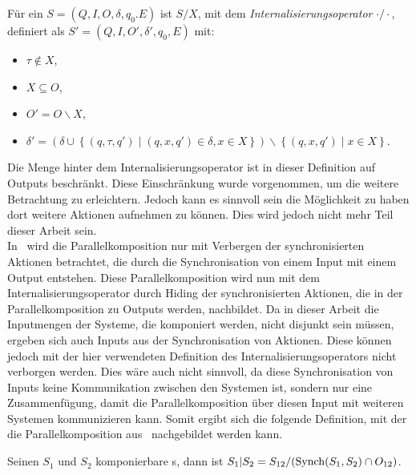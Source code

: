 \begin{Def}[Internalisierungsoperator]
  Für ein \EIO{} $S=(Q,I,O,\delta ,q_0.E)$ ist $S/X$, mit
  dem \emph{Internalisierungsoperator} $\cdot /\cdot$,
  definiert als $S'=(Q,I,O',\delta ', q_0,E)$ mit:
  \begin{itemize}
    \item $\tau \notin X$,
    \item $X\subseteq O$,
    \item $O'=O\backslash X$,
    \item $\delta '=\left(\delta\cup\left\{(q,\tau ,q')\mid (q,x,q')\in\delta
      ,x\in X\right\}\right)\backslash \left\{(q,x,q')\mid x\in X\right\}$.
  \end{itemize}
\end{Def}

Die Menge hinter dem Internalisierungsoperator ist in dieser Definition auf
Outputs beschränkt. Diese Einschränkung wurde vorgenommen, um die weitere
Betrachtung zu erleichtern. Jedoch kann es sinnvoll sein die Möglichkeit zu
haben dort weitere Aktionen aufnehmen zu können. Dies wird jedoch nicht mehr
Teil dieser Arbeit sein.\\
In~\cite{Vogler2014EIO} wird die Parallelkomposition nur mit Verbergen der
synchronisierten Aktionen betrachtet, die durch die Synchronisation von einem
Input mit einem Output entstehen. Diese Parallelkomposition wird nun mit dem
Internalisierungsoperator durch Hiding der synchronisierten Aktionen, die in
der Parallelkomposition zu Outputs werden, nachbildet. Da in dieser Arbeit
die Inputmengen der Systeme, die komponiert werden, nicht disjunkt sein müssen,
ergeben sich auch Inputs aus der Synchronisation von Aktionen. Diese können
jedoch mit der hier verwendeten Definition des Internalisierungsoperators nicht verborgen
werden. Dies wäre auch nicht sinnvoll, da diese Synchronisation von Inputs
keine Kommunikation zwischen den Systemen ist, sondern nur eine Zusammenfügung,
damit die Parallelkomposition über diesen Input mit weiteren Systemen
kommunizieren kann. Somit ergibt sich die folgende Definition, mit der die
Parallelkomposition aus~\cite{Vogler2014EIO} nachgebildet werden kann.

\begin{Def}
\label{defIntParal}
  Seinen $S_1$ und $S_2$ komponierbare \EIO{}s, dann ist
  $S_1|S_2=S_{12}/(\mathrm{Synch}(S_1,S_2)\cap O_{12})$.
\end{Def}
